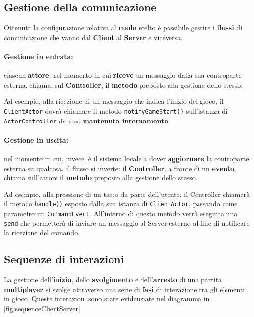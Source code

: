 \subsection{Gestione della comunicazione}
Ottenuta la configurazione relativa al \textbf{ruolo} scelto è possibile gestire i \textbf{flussi} di comunicazione che vanno dal \textbf{Client} al \textbf{Server} e viceversa.
    \paragraph{Gestione in entrata:}
    ciascun \textbf{attore}, nel momento in cui \textbf{riceve} un messaggio dalla sua controparte esterna, chiama, sul \textbf{Controller}, il \textbf{metodo} preposto alla gestione dello stesso.
    
    Ad esempio, alla ricezione di un messaggio che indica l'inizio del gioco, il \texttt{ClientActor} dovrà chiamare il metodo \texttt{notifyGameStart()} sull'istanza di \texttt{ActorController} da esso \textbf{mantenuta internamente}.
    
    \paragraph{Gestione in uscita:}
    nel momento in cui, invece, è il sistema locale a dover \textbf{aggiornare} la controparte esterna su qualcosa, il flusso si inverte: il \textbf{Controller}, a fronte di un \textbf{evento}, chiama sull'attore il \textbf{metodo} preposto alla gestione dello stesso. 
    
    Ad esempio, alla pressione di un tasto da parte dell'utente, il Controller chiamerà il metodo \texttt{handle()} esposto dalla sua istanza di \texttt{ClientActor}, passando come parametro un \texttt{CommandEvent}. All'interno di questo metodo verrà eseguita una \texttt{send} che permetterà di inviare un messaggio al Server esterno al fine di notificare la ricezione del comando. 


\subsection{Sequenze di interazioni}
La gestione dell'\textbf{inizio}, dello \textbf{svolgimento} e dell'\textbf{arresto} di una partita \textbf{multiplayer} si svolge attraverso una serie di \textbf{fasi} di interazione tra gli elementi in gioco. Queste interazioni sono state evidenziate nel diagramma in \ref{fig:sequenceClientServer}

